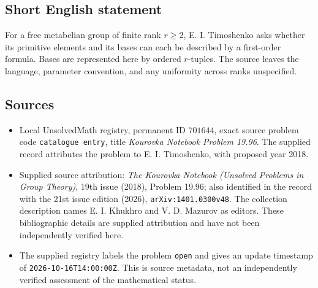 \documentclass[11pt]{article}
\begin{document}
\subsection{Short English statement}
For a free metabelian group of finite rank \(r\geq 2\), E. I. Timoshenko asks whether its primitive elements and its bases can each be described by a first-order formula. Bases are represented here by ordered \(r\)-tuples. The source leaves the language, parameter convention, and any uniformity across ranks unspecified.
\subsection{Sources}
\begin{itemize}
\item Local UnsolvedMath registry, permanent ID \(701644\), exact source problem code \texttt{catalogue entry}, title \emph{Kourovka Notebook Problem 19.96}. The supplied record attributes the problem to E. I. Timoshenko, with proposed year 2018.
\item Supplied source attribution: \emph{The Kourovka Notebook (Unsolved Problems in Group Theory)}, 19th issue (2018), Problem 19.96; also identified in the record with the 21st issue edition (2026), \texttt{arXiv:1401.0300v48}. The collection description names E. I. Khukhro and V. D. Mazurov as editors. These bibliographic details are supplied attribution and have not been independently verified here.
\item The supplied registry labels the problem \texttt{open} and gives an update timestamp of \texttt{2026-10-16T14:00:00Z}. This is source metadata, not an independently verified assessment of the mathematical status.
\end{itemize}
\end{document}
